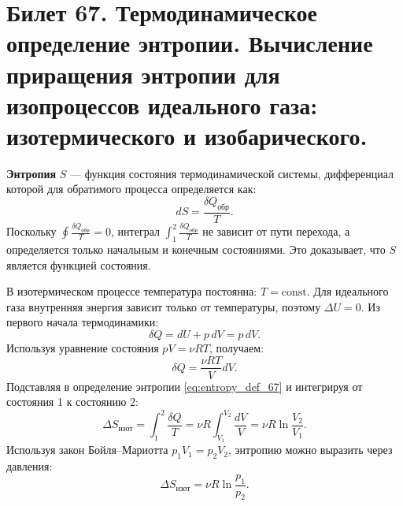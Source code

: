 \section{Билет 67. Термодинамическое определение энтропии. Вычисление приращения энтропии для изопроцессов идеального газа: изотермического и изобарического.}

\begin{definition}
\textbf{Энтропия} $S$ --- функция состояния термодинамической системы, дифференциал которой для обратимого процесса определяется как:
\begin{equation}
    dS = \frac{\delta Q_{\text{обр}}}{T}. \label{eq:entropy_def_67}
\end{equation}
Поскольку $\oint \frac{\delta Q_{\text{обр}}}{T} = 0$, интеграл $\int_1^2 \frac{\delta Q_{\text{обр}}}{T}$ не зависит от пути перехода, а определяется только начальным и конечным состояниями. Это доказывает, что $S$ является функцией состояния.
\end{definition}

\begin{theorem}
В изотермическом процессе температура постоянна: $T = \text{const}$. Для идеального газа внутренняя энергия зависит только от температуры, поэтому $\Delta U = 0$. Из первого начала термодинамики:
\begin{equation}
    \delta Q = dU + p\,dV = p\,dV.
\end{equation}
Используя уравнение состояния $pV = \nu RT$, получаем:
\begin{equation}
    \delta Q = \frac{\nu RT}{V} dV.
\end{equation}
Подставляя в определение энтропии \eqref{eq:entropy_def_67} и интегрируя от состояния 1 к состоянию 2:
\begin{equation}
    \Delta S_{\text{изот}} = \int_1^2 \frac{\delta Q}{T} = \nu R \int_{V_1}^{V_2} \frac{dV}{V} = \nu R \ln\frac{V_2}{V_1}. \label{eq:delta_S_iso_67}
\end{equation}
Используя закон Бойля--Мариотта $p_1 V_1 = p_2 V_2$, энтропию можно выразить через давления:
\begin{equation}
    \Delta S_{\text{изот}} = \nu R \ln\frac{p_1}{p_2}.
\end{equation}
\end{theorem}

